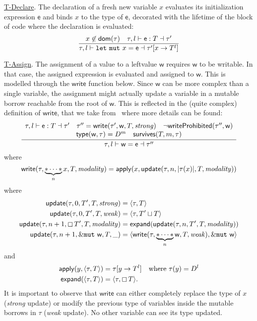 \noindent
\underline{\textsf{T-Declare}}.
The declaration of a fresh new variable $x$ evaluates its initialization expression $\mathsf{e}$ and
binds $x$ to the type of $\mathsf{e}$,
decorated with the lifetime of the block of code where the declaration is evaluated:
\[
\frac
    {x\not\in\mathsf{dom}(\tau)\quad\tau,l\vdash\mathsf{e}:T\dashv\tau'}
    {\tau,l\vdash\mathtt{let\ mut}\ x=\mathsf{e}\dashv\tau'[x\to T^l]}
\]

\noindent
\underline{\textsf{T-Assign}}.
The assignment of a value to a leftvalue $\mathsf{w}$ requires $\mathsf{w}$ to be writable.
In that case, the assigned expression is evaluated and assigned to $\mathsf{w}$.
This is modelled through the $\mathsf{write}$ function below.
Since $\mathsf{w}$ can be more complex than a single variable, the assignment might actually
update a variable in a mutable borrow reachable from the root of $\mathsf{w}$. This is reflected
in the (quite complex) definition of $\mathsf{write}$, that we take from~\cite{Pea21}
where more details can be found:
\[
\frac
    {\begin{array}{c}
        \tau,l\vdash\mathsf{e}:T\dashv\tau' \quad
      \tau''=\mathsf{write}(\tau',\mathsf{w},T,\mathit{strong}) \quad
      \neg\mathsf{writeProhibited}(\tau'',\mathsf{w})\\
      \mathsf{type}(\mathsf{w},\tau)=D^m\quad\mathsf{survives}(T,m,\tau)
      \end{array}
    }
    {\tau,l\vdash\mathsf{w}=\mathsf{e}\dashv\tau''}
\]
where
\[
\mathsf{write}(\tau,\underbrace{\mathtt{*}\cdots\mathtt{*}}_nx,T,\mathit{modality})=\mathsf{apply}
(x,\mathsf{update}(\tau,n,|\tau(x)|,T,\mathit{modality}))
\]
%
where
%
\begin{align*}
  \mathsf{update}(\tau,0,T',T,\mathit{strong})&=\langle\tau,T\rangle\\
  \mathsf{update}(\tau,0,T',T,\mathit{weak})&=\langle\tau,T'\sqcup T\rangle\\
  \mathsf{update}(\tau,n+1,\boxempty\,{T'},T,\mathit{modality})
  &=\mathsf{expand}(\mathsf{update}(\tau,n,T',T,\mathit{modality}))\\
  \mathsf{update}(\tau,n+1,\&\mathtt{mut}\ \mathsf{w},T,\_)&=
  \langle\mathsf{write}(\tau,\underbrace{\mathtt{*}\cdots\mathtt{*}}_n\mathsf{w},T,\mathit{weak}),
  \&\mathtt{mut}\ \mathsf{w}\rangle
\end{align*}
and
\begin{align*}
  \mathsf{apply}(y,\langle\tau,T\rangle)&=\tau[y\to T^l]\quad\text{where $\tau(y)=D^l$}\\
  \mathsf{expand}(\langle\tau,T\rangle)&=\langle\tau,\boxempty\,{T}\rangle.
\end{align*}
%
\noindent
It is important to observe that $\mathsf{write}$
can either completely replace the type of $x$
(\emph{strong} update) or modify the previous type of variables
inside the mutable borrows in $\tau$ (\emph{weak} update).
No other variable can see its type updated.

